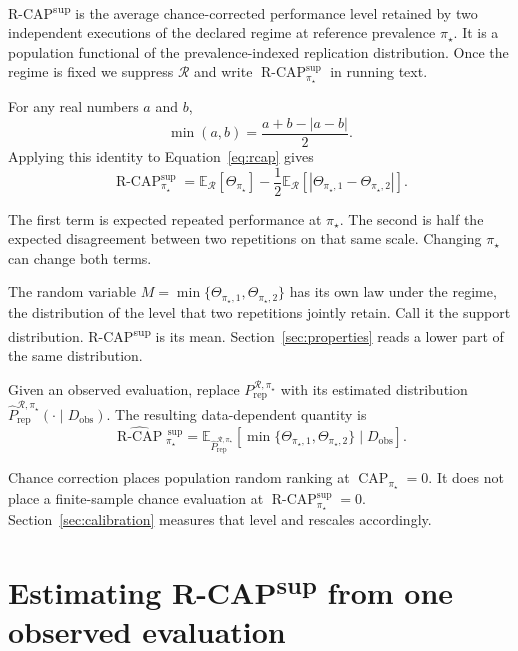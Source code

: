 \documentclass[11pt]{article}
\newcommand{\CAP}{\operatorname{CAP}}
\newcommand{\Regime}{\mathcal{R}}
\newcommand{\Tpi}{\CAP_{\pi_\star}}
\newcommand{\E}{\mathbb{E}}
\newcommand{\RCAP}{\operatorname{R\text{-}CAP}^{\mathrm{sup}}_{\pi_\star}}
\newcommand{\RCAPHat}{\widehat{\operatorname{R\text{-}CAP}}{}^{\,\mathrm{sup}}_{\pi_\star}}
\newcommand{\PRep}{P_{\mathrm{rep}}^{\Regime,\pi_\star}}
\newcommand{\PRepHat}{\widehat{P}_{\mathrm{rep}}^{\Regime,\pi_\star}}
\theoremstyle{remark}
\begin{document}
R-CAP\textsuperscript{sup} is the average chance-corrected performance level retained by two independent executions of the declared regime at reference prevalence $\pi_\star$. It is a population functional of the prevalence-indexed replication distribution. Once the regime is fixed we suppress $\Regime$ and write $\RCAP$ in running text.

For any real numbers $a$ and $b$,
\[
\min(a,b)=\frac{a+b-|a-b|}{2}.
\]
Applying this identity to Equation~\eqref{eq:rcap} gives
\begin{equation}
\RCAP
=
\E_{\Regime}[\Theta_{\pi_\star}]
-
\frac12
\E_{\Regime}
\left[
|\Theta_{\pi_\star,1}-\Theta_{\pi_\star,2}|
\right].
\label{eq:decomposition}
\end{equation}

The first term is expected repeated performance at $\pi_\star$. The second is half the expected disagreement between two repetitions on that same scale. Changing $\pi_\star$ can change both terms.

\begin{center}
\end{center}

The random variable $M=\min\{\Theta_{\pi_\star,1},\Theta_{\pi_\star,2}\}$ has its own law under the regime, the distribution of the level that two repetitions jointly retain. Call it the support distribution. R-CAP\textsuperscript{sup} is its mean. Section~\ref{sec:properties} reads a lower part of the same distribution.

Given an observed evaluation, replace $\PRep$ with its estimated distribution $\PRepHat(\cdot\mid D_{\mathrm{obs}})$. The resulting data-dependent quantity is
\begin{equation}
\RCAPHat
=
\E_{\PRepHat}
\left[
\min\{
\Theta_{\pi_\star,1},
\Theta_{\pi_\star,2}
\}
\mid D_{\mathrm{obs}}
\right].
\label{eq:rcap-estimated}
\end{equation}

Chance correction places population random ranking at $\Tpi=0$. It does not place a finite-sample chance evaluation at $\RCAP=0$. Section~\ref{sec:calibration} measures that level and rescales accordingly.

\section{Estimating R-CAP\textsuperscript{sup} from one observed evaluation}
\end{document}
